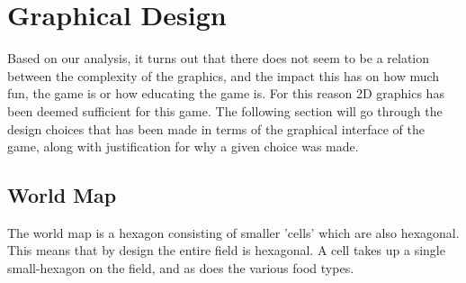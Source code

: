 \section{Graphical Design}

Based on our analysis, it turns out that there does not seem to be a relation between the complexity of the graphics, and the impact this has on how 
much fun, the game is or how educating the game is. For this reason 2D graphics has been deemed sufficient for this game. The following section will go 
through the design choices that has been made in terms of the graphical interface of the game, along with justification for why a given choice was made.

\subsection{World Map}

The world map is a hexagon consisting of smaller 'cells' which are also hexagonal. This means that by design the entire field is hexagonal. A cell takes 
up a single small-hexagon on the field, and as does the various food types.

